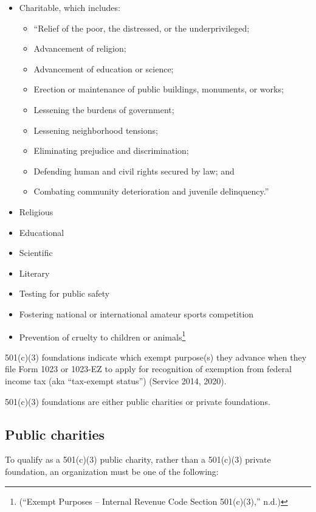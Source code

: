 \documentclass[
  letterpaper,
  DIV=11,
  numbers=noendperiod]{scrreprt}
\begin{document}
\begin{itemize}
\item
  Charitable, which includes:

  \begin{itemize}
  \item
    ``Relief of the poor, the distressed, or the underprivileged;
  \item
    Advancement of religion;
  \item
    Advancement of education or science;
  \item
    Erection or maintenance of public buildings, monuments, or works;
  \item
    Lessening the burdens of government;
  \item
    Lessening neighborhood tensions;
  \item
    Eliminating prejudice and discrimination;
  \item
    Defending human and civil rights secured by law; and
  \item
    Combating community deterioration and juvenile delinquency.''
  \end{itemize}
\item
  Religious
\item
  Educational
\item
  Scientific
\item
  Literary
\item
  Testing for public safety
\item
  Fostering national or international amateur sports competition
\item
  Prevention of cruelty to children or animals\footnote{({``Exempt
    Purposes -- Internal Revenue Code Section 501(c)(3),''} n.d.)}
\end{itemize}

501(c)(3) foundations indicate which exempt purpose(s) they advance when
they file Form 1023 or 1023-EZ to apply for recognition of exemption
from federal income tax (aka ``tax-exempt status'') (Service 2014,
2020).

501(c)(3) foundations are either public charities or private
foundations.

\hypertarget{public-charities}{%
\subsection{Public charities}\label{public-charities}}

To qualify as a 501(c)(3) public charity, rather than a 501(c)(3)
private foundation, an organization must be one of the following:
\end{document}
